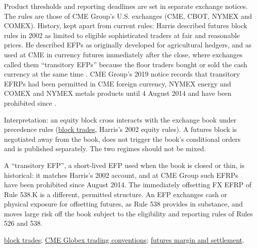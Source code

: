 \begin{qfconvention}
 Product thresholds and reporting deadlines are set in separate exchange notices. The rules are those of CME Group's U.S. exchanges (CME, CBOT, NYMEX and COMEX). History, kept apart from current rules: Harris described futures block rules in 2002 as limited to eligible sophisticated traders at fair and reasonable prices. He described EFPs as originally developed for agricultural hedgers, and as used at CME in currency futures immediately after the close, where exchanges called them ``transitory EFPs'' because the floor traders bought or sold the cash currency at the same time \citep[chap.~``Block Traders'', sec.~15.6.2, p.~334]{alpha-harris}. CME Group's 2019 notice records that transitory EFRPs had been permitted in CME foreign currency, NYMEX energy and COMEX and NYMEX metals products until 4 August 2014 and have been prohibited since \citep[p.~1]{cme-ra1911-5}.

 Interpretation: an equity block cross interacts with the exchange book under precedence rules (\hyperref[def:block-trade]{block trades}, Harris's 2002 equity rules). A futures block is negotiated away from the book, does not trigger the book's conditional orders and is published separately. The two regimes should not be mixed.

 A ``transitory EFP'', a short-lived EFP used when the book is closed or thin, is historical: it matches Harris's 2002 account, and at CME Group such EFRPs have been prohibited since August 2014. The immediately offsetting FX EFRP of Rule 538.K is a different, permitted structure. An EFP exchanges cash or physical exposure for offsetting futures, as Rule 538 provides in substance, and moves large risk off the book subject to the eligibility and reporting rules of Rules 526 and 538.

 \hyperref[def:block-trade]{block trades}; \hyperref[conv:cme-globex-trading]{CME Globex trading conventions}; \hyperref[mech:futures-margin-settlement]{futures margin and settlement}.

\end{qfconvention}

